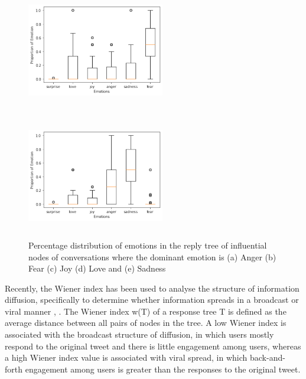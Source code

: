 \documentclass[acmtog]{acmart}
\begin{document}
\begin{figure}[h]
\begin{minipage}{.33\textwidth}
    \includegraphics[width=6cm,height=5.5cm,keepaspectratio]{plots/dis_love.pdf}
  \end{minipage}%
  \begin{minipage}{.33\textwidth}
    \centering
    \includegraphics[width=6cm,height=5.5cm,keepaspectratio]{plots/dis_sad.pdf}
  \end{minipage}
  
  \caption{Percentage distribution of emotions in the reply tree of influential nodes of conversations where the dominant emotion is (a) Anger (b) Fear (c) Joy (d) Love and (e) Sadness}
  \label{SampleConv}
  \end{figure}
  
Recently, the Wiener index has been used to analyse the structure of information diffusion, specifically to determine whether information spreads in a broadcast or viral manner \cite{saveski2021structure}, \cite{goel2016structural}. The Wiener index w(T) of a response tree T is defined as the average distance between all pairs of nodes in the tree. A low Wiener index is associated with the broadcast structure of diffusion, in which users mostly respond to the original tweet and there is little engagement among users, whereas a high Wiener index value is associated with viral spread, in which back-and-forth engagement among users is greater than the responses to the original tweet. 
\end{document}

